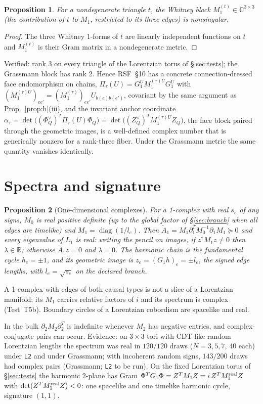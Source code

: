 \documentclass[11pt]{article}
\theoremstyle{definition}
\theoremstyle{plain}
\newtheorem{proposition}{Proposition}[section]
\theoremstyle{remark}
\newcommand{\C}{\mathbb{C}}
\newcommand{\R}{\mathbb{R}}
\newcommand{\diag}{\operatorname{diag}}
\newcommand{\bd}{\partial}
\newcommand{\Tr}{^{T}}
\newcommand{\ttt}[1]{\texttt{#1}}
\newcommand{\At}{\widetilde{A}}
\begin{document}
\begin{proposition}\label{prop:face}
For a nondegenerate triangle \(t\), the Whitney block \(M_1^{(t)}\in\C^{3\times3}\) (the contribution of \(t\) to \(M_1\), restricted to its three edges) is nonsingular.
\end{proposition}
\begin{proof}
The three Whitney 1-forms of \(t\) are linearly independent functions on \(t\) and \(M_1^{(t)}\) is their Gram matrix in a nondegenerate metric.
\end{proof}
Verified: rank 3 on every triangle of the Lorentzian torus of \S\ref{sec:tests}; the Grassmann block has rank 2. Hence RSF~\S10 has a concrete connection-dressed face endomorphism on chains, \(\Pi_\tau(U)=G_1^{U}M_1^{(\tau)U}G_1^{U}\) with \((M_1^{(\tau)U})_{ee'}=(M_1^{(\tau)})_{ee'}U_{b(e)b(e')}\), covariant by the same argument as Prop.~\ref{prop:h}(iii), and the invariant anchor coordinate \(\alpha_\tau=\det\big((\Phi_Q^{\vee})\Tr\Pi_\tau(U)\Phi_Q\big)=\det\big((Z_Q^{\vee})\Tr M_1^{(\tau)U}Z_Q\big)\), the face block paired through the geometric images, is a well-defined complex number that is generically nonzero for a rank-three fiber. Under the Grassmann metric the same quantity vanishes identically.

\section{Spectra and signature}\label{sec:spectra}

\begin{proposition}[One-dimensional complexes]
For a 1-complex with real \(s_e\) of any signs, \(M_0\) is real positive definite (up to the global factor of \S\ref{sec:branch} when all edges are timelike) and \(M_1=\diag(1/l_e)\). Then \(\At_1=M_1\bd_1\Tr M_0^{-1}\bd_1M_1\succeq0\) and every eigenvalue of \(L_1\) is real: writing the pencil on images, if \(z^{\dagger}M_1z\ne0\) then \(\lambda\in\R\); otherwise \(\At_1z=0\) and \(\lambda=0\). The harmonic chain is the fundamental cycle \(h_e=\pm1\), and its geometric image is \(z_e=(G_1h)_e=\pm l_e\), the signed edge lengths, with \(l_e=\sqrt{s_e}\) on the declared branch.
\end{proposition}
A 1-complex with edges of both causal types is not a slice of a Lorentzian manifold; its \(M_1\) carries relative factors of \(i\) and its spectrum is complex (Test~T5b). Boundary circles of a Lorentzian cobordism are spacelike and real.

In the bulk \(\bd_2M_2\bd_2\Tr\) is indefinite whenever \(M_2\) has negative entries, and complex-conjugate pairs can occur. Evidence: on \(3\times3\) tori with CDT-like random Lorentzian lengths the spectrum was real in \(120/120\) draws (\(N=3,5,7\), 40 each) under \ttt{L2} and under Grassmann; with incoherent random signs, \(143/200\) draws had complex pairs (Grassmann; \ttt{L2} to be run). On the fixed Lorentzian torus of \S\ref{sec:tests} the harmonic 2-plane has Gram \(\Phi\Tr G_1\Phi=Z\Tr M_1Z=i\,Z\Tr M_1^{\rm real}Z\) with \(\det(Z\Tr M_1^{\rm real}Z)<0\): one spacelike and one timelike harmonic cycle, signature \((1,1)\).
\end{document}
